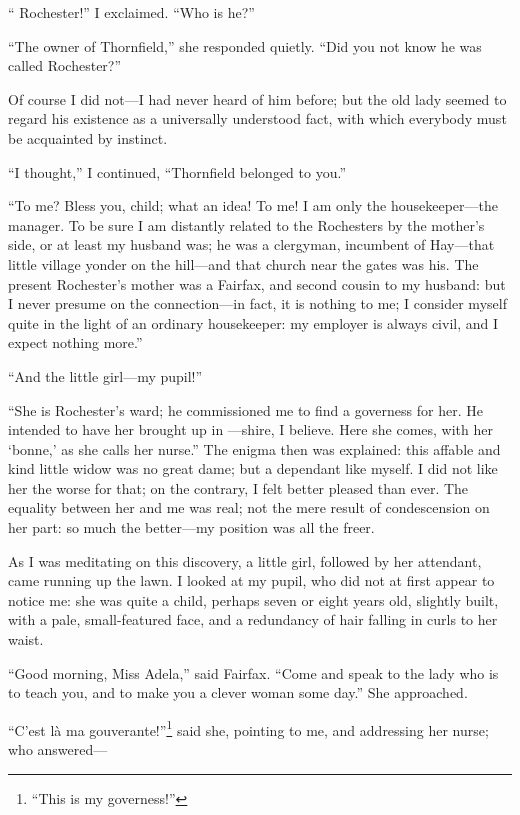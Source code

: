 \enquote{\Mr{} Rochester!} I exclaimed. \enquote{Who is he?}

\enquote{The owner of Thornfield,} she responded quietly. \enquote{Did
you not know he was called Rochester?}

Of course I did not---I had never heard of him before; but the old lady
seemed to regard his existence as a universally understood fact, with
which everybody must be acquainted by instinct.

\enquote{I thought,} I continued, \enquote{Thornfield belonged to you.}

\enquote{To me? Bless you, child; what an idea! To me! I am only the
housekeeper---the manager. To be sure I am distantly related to the
 Rochesters by the mother's side, or at least my husband was; he was a
clergyman, incumbent of Hay---that little village yonder on the
hill---and that church near the gates was his. The present \Mr{}
 Rochester's mother was a Fairfax, and second cousin to my husband: but I
never presume on the connection---in fact, it is nothing to me; I
consider myself quite in the light of an ordinary housekeeper: my
employer is always civil, and I expect nothing more.}

\enquote{And the little girl---my pupil!}

\enquote{She is \Mr{} Rochester's ward; he commissioned me to find a
governess for her. He intended to have her brought up in ---shire, I
believe. Here she comes, with her \foreignquote{french}{bonne,} as she calls her
nurse.} The enigma then was explained: this affable and kind little
widow was no great dame; but a dependant like myself. I did not like
her the worse for that; on the contrary, I felt better pleased than
ever. The equality between her and me was real; not the mere result of
condescension on her part: so much the better---my position was all the
freer.

As I was meditating on this discovery, a little girl, followed by her
attendant, came running up the lawn. I looked at my pupil, who did not
at first appear to notice me: she was quite a child, perhaps seven or
eight years old, slightly built, with a pale, small-featured face, and a
redundancy of hair falling in curls to her waist.

\enquote{Good morning, Miss Adela,} said \Mrs{} Fairfax. \enquote{Come
and speak to the lady who is to teach you, and to make you a clever
woman some day.} She approached.

\foreignquote{french}{C'est là ma gouverante!}\footnote{\enquote{This is my governess!}} said she, pointing to me, and
addressing her nurse; who answered---


